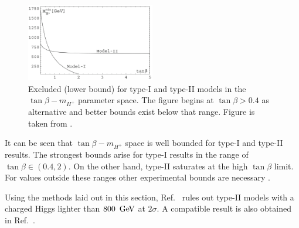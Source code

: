 \begin{figure}[htbp!]
    \centering
        \includegraphics[width=0.5\textwidth]{figures/theory/xsgamma_2hdm_both_types.png}
    \caption{\label{fig:2hdm_limits} 
    Excluded (lower bound) for type-I and type-II \TwoHDM models in the $\tan\beta-m_{H^+}$ parameter space.
    The figure begins at $\tan\beta>0.4$ as alternative and better bounds exist below that range.
    Figure is taken from \cite{Misiak:2017bgg}.}
\end{figure}

It can be seen that $\tan\beta-m_{H^+}$ space is well bounded for type-I and type-II \TwoHDM results.
The strongest bounds arise for type-I \TwoHDM results in the range of $\tan\beta\in(0.4,2)$.
On the other hand, type-II \TwoHDM saturates at the high $\tan\beta$ limit.
For values outside these ranges other experimental bounds are necessary \cite{Misiak:2017bgg}.

Using the methods laid out in this section, Ref.~\cite{Misiak:2020vlo} rules out type-II \TwoHDM models with a charged Higgs lighter than $800~\mathrm{\,Ge\kern -0.1em V}$ at $2\sigma$.
A compatible result is also obtained in Ref.~\cite{Atkinson:2021eox}.